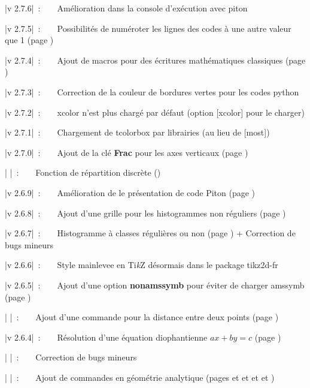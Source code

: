 \documentclass[a4paper,french,11pt]{article}
\providecommand\tikzlogo{Ti\textit{k}Z}
\let\TikZ\tikzlogo
\newcommand\Cle[1]{{\bfseries\sffamily\textlangle \textcolor{orange!75!black}{#1}\textrangle}}
\begin{document}
{\small \bverb|v 2.7.6|~:~~~~Amélioration dans la console d'exécution avec \textsf{piton}}

{\small \bverb|v 2.7.5|~:~~~~Possibilités de numéroter les lignes des codes à une autre valeur que 1 (page \pageref{codenumlignes})

{\small \bverb|v 2.7.4|~:~~~~Ajout de macros pour des écritures mathématiques classiques (page \pageref{ecrituresmath})}

{\small \bverb|v 2.7.3|~:~~~~Correction de la couleur de bordures vertes pour les codes python}

{\small \bverb|v 2.7.2|~:~~~~\textsf{xcolor} n'est plus chargé par défaut (option \textsf{[xcolor]} pour le charger)

{\small \bverb|v 2.7.1|~:~~~~Chargement de \textsf{tcolorbox} par librairies (au lieu de \textsf{[most]})

{\small \bverb|v 2.7.0|~:~~~~Ajout de la clé \Cle{Frac} pour les axes verticaux (page \pageref{reperagetikz})

{\small \bverb|       |~:~~~~Fonction de répartition discrète (\pageref{fctrepart})

{\small \bverb|v 2.6.9|~:~~~~Amélioration de le présentation de code \textsf{Piton} (page \pageref{pythonpiton})

{\small \bverb|v 2.6.8|~:~~~~Ajout d'une grille pour les histogrammes non réguliers (page \pageref{histo})

{\small \bverb|v 2.6.7|~:~~~~Histogramme à classes régulières ou non (page \pageref{histo}) + Correction de bugs mineurs

{\small \bverb|v 2.6.6|~:~~~~Style \textsf{mainlevee} en \TikZ{} désormais dans le package \textsf{tikz2d-fr}

{\small \bverb|v 2.6.5|~:~~~~Ajout d'une option \Cle{nonamssymb} pour éviter de charger \textsf{amssymb} (page \pageref{amssymb})

{\small \bverb|       |~:~~~~Ajout d'une commande pour la distance entre deux points (page \pageref{normevect})}

{\small \bverb|v 2.6.4|~:~~~~Résolution d'une équation diophantienne $ax+by=c$ (page \pageref{eqdioph})

{\small \bverb|       |~:~~~~Correction de bugs mineurs

{\small \bverb|       |~:~~~~Ajout de commandes en géométrie analytique (pages \pageref{affcoord} et \pageref{eqcartplan} et \pageref{eqparamdroite} et \pageref{eqcartdroite} et \pageref{distptplan})

}}}}}}}}}}}}}
\end{document}
